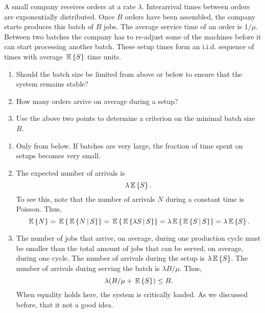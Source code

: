\begin{question} 

  A small company receives orders at a rate $\lambda$.  Interarrival
  times between orders are exponentially distributed. Once $B$ orders
  have been assembled, the company starts produces this batch of $B$
  jobs.  The average service time of an order is $1/\mu$. Between two
  batches the company has to re-adjust some of the machines before it
  can start processing another batch. These setup times form an
  i.i.d. sequence of times with average $\,\mathbb{E}\left\{S\right\}$ time units.

\begin{enumerate}
\item Should the batch size be limited from above or below to ensure that the system remains stable? 
\item How many orders arrive on average during a setup?
\item Use the above two points to determine a criterion on the minimal
  batch size $B$.
\end{enumerate}

\begin{solution}
\begin{enumerate}
\item Only from below. If batches are very large, the fraction of time spent on setups becomes very small.
\item The expected number of arrivals is 
\begin{equation*}
    \lambda \,\mathbb{E}\left\{S\right\}.
  \end{equation*}
To see this, note that  the number of arrivals $N$ during a constant time is Poisson. Thus,
\begin{equation*}
  \,\mathbb{E}\left\{N\right\} = \,\mathbb{E}\left\{ \,\mathbb{E}\left\{N\,\middle|\, S\right\}\right\} = \,\mathbb{E}\left\{ \,\mathbb{E}\left\{\lambda S\,\middle|\, S\right\}\right\} = \lambda \,\mathbb{E}\left\{\,\mathbb{E}\left\{S \,\middle|\, S\right\}\right\} = \lambda \,\mathbb{E}\left\{S\right\}.
\end{equation*}

\item  The number of jobs that arrive, on average, during one
  production cycle must be smaller than the total amount of jobs that
  can be served, on average, during one cycle.   The number of arrivals during the setup is $\lambda \,\mathbb{E}\left\{S\right\}$. The number of arrivals during serving the batch is $\lambda B/\mu$. Thus, 
  \begin{equation*}
    \lambda ( B/\mu + \,\mathbb{E}\left\{S\right\}) \leq B.
  \end{equation*}
  When equality holds here, the system is critically loaded. As we
  discussed before, that it not a good idea.
\end{enumerate}
\end{solution}
\end{question}


